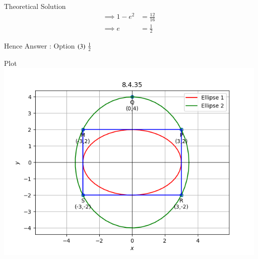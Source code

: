 \documentclass{beamer}
\begin{document}
\begin{frame}{Theoretical Solution}
\begin{align}
    \implies 1-e^2 &= \frac{12}{16}\\
    \implies e &= \frac{1}{2}
\end{align}

Hence Answer : Option $\left(3\right)\,\frac{1}{2}$
\end{frame}

\begin{frame}{Plot}
    \centering
    \includegraphics[width=\columnwidth, height=0.8\textheight, keepaspectratio]{../figs/graph2.png}   
\end{frame}
\end{document}
